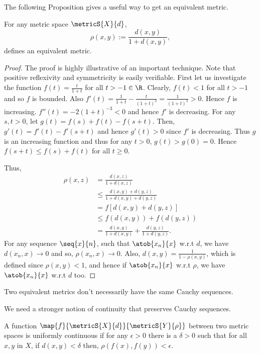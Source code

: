 The following Proposition gives a useful way to get an equivalent metric.
\begin{Proposition}
    For any metric space $\metricS{X}{d}$,
    \[\rho(x,y) := \frac{d(x,y)}{1 + d(x,y)},\]
    defines an equivalent metric.
\end{Proposition}
\begin{proof}
    The proof is highly illustrative of an important technique. Note that positive reflexivity and
    symmetricity is easily verifiable.
    First let us investigate the function $f(t) = \frac{t}{1+t}$ for all $t > -1 \in \R $.
    Clearly, $f(t) < 1$ for all $t > -1$ and so $f$ is bounded. Also 
    $f'(t) = \frac{1}{1+t} - \frac{t}{{(1+t)}^2} = \frac{1}{{(1+t)}^2} > 0$. Hence $f$ is increasing.
    $f''(t) = -2{(1 + t)}^{-3} < 0$ and hence $f'$ is decreasing.
    For any $s,t > 0$, let $g(t) = f(s) + f(t) - f(s + t)$. Then, $g'(t) = f'(t) - f'(s+t)$ and hence $g'(t)
    > 0$ since $f'$ is decreasing. Thus $g$ is an increasing function and thus for any $t > 0$,
    $g(t) > g(0) = 0$. Hence $f(s+t) \leq f(s) + f(t)$ for all $t \geq 0$.

    Thus,
    \begin{align*}
	\rho(x,z) &= \frac{d(x,z)}{1 + d(x,z)}\\
	& \leq \frac{d(x,y)+d(y,z)}{1 + d(x,y)+d(y,z)}\\
	&= f\left[d(x,y) + d(y,z)\right]\\
	&\leq f(d(x,y)) + f(d(y,z))\\
	& = \frac{d(x,y)}{1 + d(x,y)} + \frac{d(y,z)}{1 + d(y,z)}.
    \end{align*}
    For any sequence $\seq{x}{n}$, such that $\atob{x_n}{x}$ w.r.t $d$, we have $d(x_n,x)\to 0$ and so,
    $\rho(x_n,x)\to 0$. Also, $d(x,y) = \frac{1}{1 - \rho(x,y)}$, which is defined since $\rho(x,y) < 1$, and
    hence if $\atob{x_n}{x}$ w.r.t $\rho$, we have $\atob{x_n}{x}$ w.r.t $d$ too.
    
\end{proof}
\begin{Remark}
    Two equivalent metrics don't necessarily have the same Cauchy sequences.
\end{Remark}
We need a stronger notion of continuity that preserves Cauchy sequences.
\begin{Definition}[name=uniform continuity]
    A function $\map{f}{\metricS{X}{d}}{\metricS{Y}{\rho}}$ between two metric spaces is uniformly continuous
    if for any $\epsilon > 0$ there is a $\delta > 0$ such that for all $x,y$ in $X$, if $d(x,y) < \delta$
    then, $\rho(f(x),f(y)) < \epsilon$.
\end{Definition}
